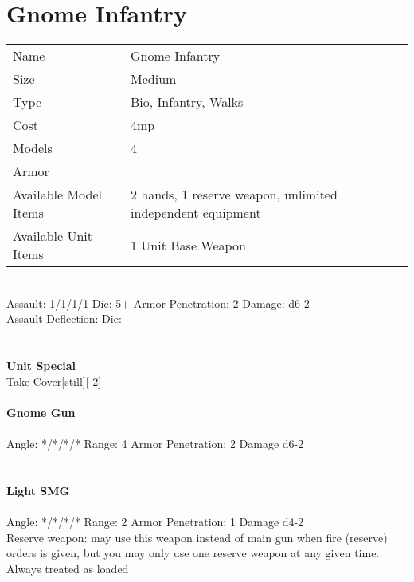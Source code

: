 \pagebreak

\section{ Gnome Infantry }

\begin{tabular}{ll}
  Name & Gnome Infantry \\
  Size & Medium\\
  Type & Bio, Infantry, Walks\\
  Cost & 4mp\\
  Models & 4\\
  Armor & \\
  Available Model Items & 2 hands, 1 reserve weapon, unlimited independent equipment \\
  Available Unit Items & 1 Unit Base Weapon \\
\end{tabular}

\ \\
Assault: 1/1/1/1 Die: 5+ Armor Penetration: 2 Damage: d6-2 \\
Assault Deflection:  Die: \\
\indent  \\
\ \\

{\bf Unit Special} \\
Take-Cover[still][-2]
\ \\
\ \\
{\bf Gnome Gun } \\
\ \\
Angle: */*/*/* Range: 4 Armor Penetration: 2 Damage d6-2 \\
\indent  \\



\ \\
{\bf Light SMG } \\
\ \\
Angle: */*/*/* Range: 2 Armor Penetration: 1 Damage d4-2 \\
\indent Reserve weapon: may use this weapon instead of main gun when fire (reserve) orders is given, but you may only use one reserve weapon at any given time. Always treated as loaded \\





